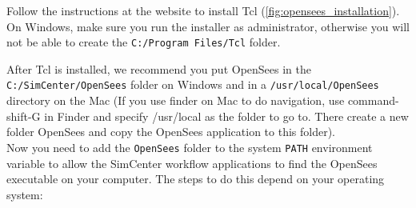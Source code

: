 Follow the instructions at the website to install Tcl (\autoref{fig:opensees_installation}). On Windows, make sure you run the installer as administrator, otherwise you will not be able to create the \texttt{C:/Program Files/Tcl} folder.

After Tcl is installed, we recommend you put OpenSees in the \texttt{C:/SimCenter/OpenSees} folder on Windows and in a \texttt{/usr/local/OpenSees} directory on the Mac (If you use finder on Mac to do navigation, use command-shift-G in Finder and specify /usr/local as the folder to go to. There create a new folder OpenSees and copy the OpenSees application to this folder).\\


Now  you need to add the \texttt{OpenSees} folder to the system \texttt{PATH} environment variable to allow the SimCenter workflow applications to find the OpenSees executable on your computer. The steps to do this depend on your operating system:

